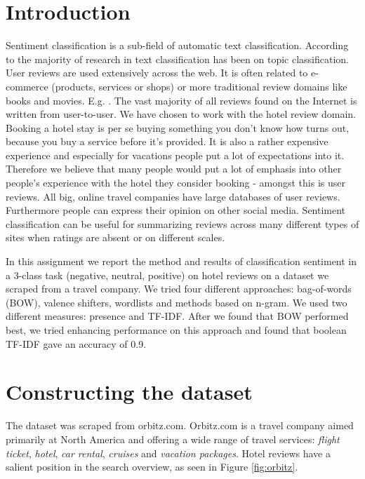 \documentclass{article}
\begin{document}

\pagestyle{fancy}
\lhead{}
\chead{\leftmark}
\rhead{}
\cfoot{}

\tableofcontents
\vfill

\section{Introduction}

Sentiment classification is a sub-field of automatic text classification. According to \cite{pangetal} the majority of research in text classification has been on topic classification. User reviews are used extensively across the web. It is often related to e-commerce (products, services or shops) or more traditional review domains like books and movies. E.g. \cite{pangetal}\cite{kennedy}\cite{blitzer}. The vast majority of all reviews found on the Internet is written from user-to-user. We have chosen to work with the hotel review domain. Booking a hotel stay is per se buying something you don’t know how turns out, because you buy a service before it’s provided. It is also a rather expensive experience and especially for vacations people put a lot of expectations into it. Therefore we believe that many people would put a lot of emphasis into other people’s experience with the hotel they consider booking - amongst this is user reviews. All big, online travel companies have large databases of user reviews. Furthermore people can express their opinion on other social media.  Sentiment classification can be useful for summarizing reviews across many different types of sites when ratings are absent or on different scales. 
\smallskip

In this assignment we report the method and results of classification sentiment in a 3-class task (negative, neutral, positive) on hotel reviews on a dataset we scraped from a travel company. We tried four different approaches: bag-of-words (BOW), valence shifters, wordlists and methods based on n-gram. We used two different measures: presence and TF-IDF. After we found that BOW performed best, we tried enhancing performance on this approach and found that boolean TF-IDF gave an accuracy of 0.9. 

\section{Constructing the dataset}
The dataset was scraped from orbitz.com. Orbitz.com is a travel company aimed primarily at North America and offering a wide range of travel services: \textit{flight ticket}, \textit{hotel}, \textit{car rental}, \textit{cruises} and \textit{vacation packages}. Hotel reviews have a salient position in the search overview, as seen in Figure \ref{fig:orbitz}. 
\end{document}
